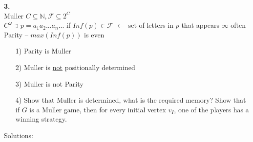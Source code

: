 \noindent
\textbf{3.}\\
Muller $C \subseteq \mathbb{N}, \mathcal{F} \subseteq 2^{C}$\\
$C^{\omega} \ni p = a_1a_2...a_n...$ if $Inf(p) \in \mathcal{F}$ $\longleftarrow$ set of letters in $p$ that appears $\infty$-often\\
Parity -- $max(Inf(p))$ is even
\begin{itemize}
	\item[1)] Parity is Muller
	\item[2)] Muller is \underline{not} positionally determined
	\item[3)] Muller is not Parity
	\item[4)] Show that Muller is determined, what is the required memory?
	Show that if $G$ is a Muller game, then for every initial vertex $v_I$, one of the players has a winning strategy.
\end{itemize}
Solutions:
